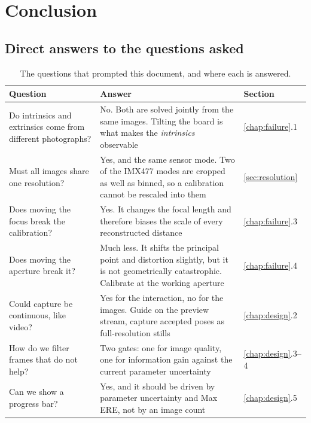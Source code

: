 \chapter{Conclusion}

\section{Direct answers to the questions asked}

\begin{table}[!ht]
\centering
\small
\caption[Answers to the operator questions]{The questions that prompted this document, and where each is answered.}
\label{tab:answers}
\begin{tabularx}{\textwidth}{p{} X p{}}
\toprule
\textbf{Question} & \textbf{Answer} & \textbf{Section} \\
\midrule
Do intrinsics and extrinsics come from different photographs? & No. Both are solved jointly from the same images. Tilting the board is what makes the \emph{intrinsics} observable & \ref{chap:failure}.1 \\
Must all images share one resolution? & Yes, and the same sensor mode. Two of the IMX477 modes are cropped as well as binned, so a calibration cannot be rescaled into them & \ref{sec:resolution} \\
Does moving the focus break the calibration? & Yes. It changes the focal length and therefore biases the scale of every reconstructed distance & \ref{chap:failure}.3 \\
Does moving the aperture break it? & Much less. It shifts the principal point and distortion slightly, but it is not geometrically catastrophic. Calibrate at the working aperture & \ref{chap:failure}.4 \\
Could capture be continuous, like video? & Yes for the interaction, no for the images. Guide on the preview stream, capture accepted poses as full-resolution stills & \ref{chap:design}.2 \\
How do we filter frames that do not help? & Two gates: one for image quality, one for information gain against the current parameter uncertainty & \ref{chap:design}.3--4 \\
Can we show a progress bar? & Yes, and it should be driven by parameter uncertainty and Max ERE, not by an image count & \ref{chap:design}.5 \\
\bottomrule
\end{tabularx}
\end{table}

